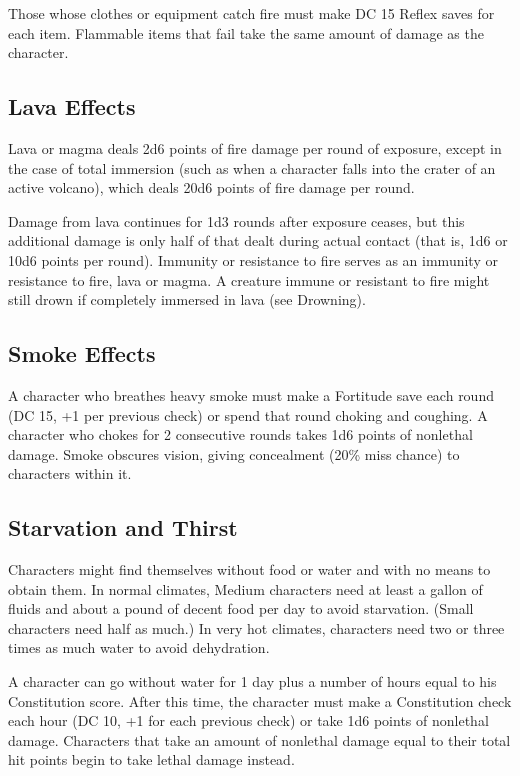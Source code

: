 Those whose clothes or equipment catch fire must make DC 15 Reflex saves for each item. Flammable items that fail take the same amount of damage as the character.
				
\subsection{Lava Effects}

				
Lava or magma deals 2d6 points of fire damage per round of exposure, except in the case of total immersion (such as when a character falls into the crater of an active volcano), which deals 20d6 points of fire damage per round.
				
Damage from lava continues for 1d3 rounds after exposure ceases, but this additional damage is only half of that dealt during actual contact (that is, 1d6 or 10d6 points per round). Immunity or resistance to fire serves as an immunity or resistance to fire, lava or magma. A creature immune or resistant to fire might still drown if completely immersed in lava (see Drowning).
				
\subsection{Smoke Effects}

				
A character who breathes heavy smoke must make a Fortitude save each round (DC 15, +1 per previous check) or spend that round choking and coughing. A character who chokes for 2 consecutive rounds takes 1d6 points of nonlethal damage. Smoke obscures vision, giving concealment (20\% miss chance) to characters within it.
				
\subsection{Starvation and Thirst}

				
Characters might find themselves without food or water and with no means to obtain them. In normal climates, Medium characters need at least a gallon of fluids and about a pound of decent food per day to avoid starvation. (Small characters need half as much.) In very hot climates, characters need two or three times as much water to avoid dehydration.
				
A character can go without water for 1 day plus a number of hours equal to his Constitution score. After this time, the character must make a Constitution check each hour (DC 10, +1 for each previous check) or take 1d6 points of nonlethal damage. Characters that take an amount of nonlethal damage equal to their total hit points begin to take lethal damage instead.
				
